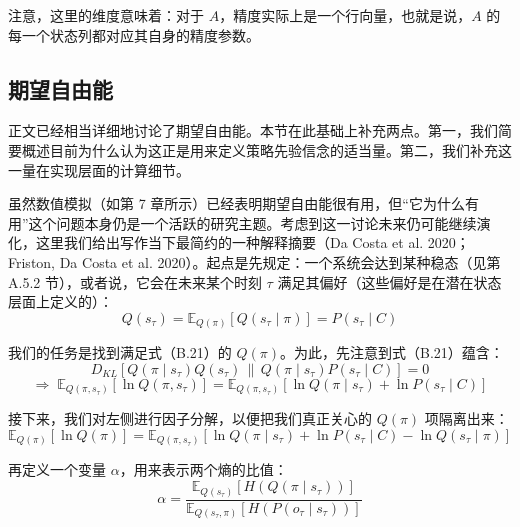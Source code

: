 注意，这里的维度意味着：对于 $A$，精度实际上是一个行向量，也就是说，$A$ 的每一个状态列都对应其自身的精度参数。

\subsection{期望自由能}

正文已经相当详细地讨论了期望自由能。本节在此基础上补充两点。第一，我们简要概述目前为什么认为这正是用来定义策略先验信念的适当量。第二，我们补充这一量在实现层面的计算细节。

虽然数值模拟（如第 7 章所示）已经表明期望自由能很有用，但“它为什么有用”这个问题本身仍是一个活跃的研究主题。考虑到这一讨论未来仍可能继续演化，这里我们给出写作当下最简约的一种解释摘要（Da Costa et al. 2020；Friston, Da Costa et al. 2020）。起点是先规定：一个系统会达到某种稳态（见第 A.5.2 节），或者说，它会在未来某个时刻 $\tau$ 满足其偏好（这些偏好是在潜在状态层面上定义的）：
\begin{equation}
Q(s_\tau)=\mathbb{E}_{Q(\pi)}[Q(s_\tau\mid \pi)]=P(s_\tau\mid C)
\tag{B.21}
\end{equation}

我们的任务是找到满足式（B.21）的 $Q(\pi)$。为此，先注意到式（B.21）蕴含：
\begin{equation}
D_{KL}\!\left[Q(\pi\mid s_\tau)Q(s_\tau)\,\|\,Q(\pi\mid s_\tau)P(s_\tau\mid C)\right]=0
\tag{B.22}
\end{equation}
\begin{equation}
\Rightarrow\;
\mathbb{E}_{Q(\pi,s_\tau)}[\ln Q(\pi,s_\tau)]
=
\mathbb{E}_{Q(\pi,s_\tau)}[\ln Q(\pi\mid s_\tau)+\ln P(s_\tau\mid C)]
\tag{B.22续}
\end{equation}

接下来，我们对左侧进行因子分解，以便把我们真正关心的 $Q(\pi)$ 项隔离出来：
\begin{equation}
\mathbb{E}_{Q(\pi)}[\ln Q(\pi)]
=
\mathbb{E}_{Q(\pi,s_\tau)}
\!\left[
\ln Q(\pi\mid s_\tau)
+\ln P(s_\tau\mid C)
-\ln Q(s_\tau\mid \pi)
\right]
\tag{B.23}
\end{equation}

再定义一个变量 $\alpha$，用来表示两个熵的比值：
\begin{equation}
\alpha
=
\frac{
\mathbb{E}_{Q(s_\tau)}\!\left[H\!\left(Q(\pi\mid s_\tau)\right)\right]
}{
\mathbb{E}_{Q(s_\tau,\pi)}\!\left[H\!\left(P(o_\tau\mid s_\tau)\right)\right]
}
\tag{B.24}
\end{equation}

